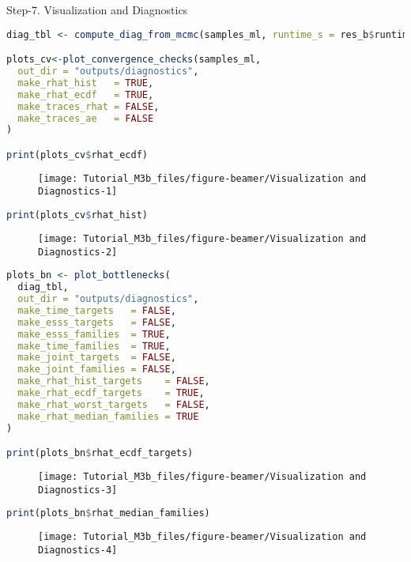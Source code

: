 \documentclass[
  10pt,
  ignorenonframetext,
  aspectratio=169]{beamer}
\begin{document}
\begin{frame}[fragile]{Step-7. Visualization and Diagnostics}
\label{step-7.-visualization-and-diagnostics}
\begin{lstlisting}[language=R]
diag_tbl <- compute_diag_from_mcmc(samples_ml, runtime_s = res_b$runtime_s)

plots_cv<-plot_convergence_checks(samples_ml,
  out_dir = "outputs/diagnostics",
  make_rhat_hist   = TRUE,
  make_rhat_ecdf   = TRUE,
  make_traces_rhat = FALSE,
  make_traces_ae   = FALSE
)

print(plots_cv$rhat_ecdf)
\end{lstlisting}

\begin{figure}
\texttt{[image: Tutorial\_M3b\_files/figure-beamer/Visualization and Diagnostics-1]} \end{figure}

\begin{lstlisting}[language=R]
print(plots_cv$rhat_hist)
\end{lstlisting}

\begin{figure}
\texttt{[image: Tutorial\_M3b\_files/figure-beamer/Visualization and Diagnostics-2]} \end{figure}

\begin{lstlisting}[language=R]
plots_bn <- plot_bottlenecks(
  diag_tbl,
  out_dir = "outputs/diagnostics",
  make_time_targets   = FALSE,
  make_esss_targets   = FALSE,
  make_esss_families  = TRUE,
  make_time_families  = TRUE,
  make_joint_targets  = FALSE,
  make_joint_families = FALSE,
  make_rhat_hist_targets    = FALSE,
  make_rhat_ecdf_targets    = TRUE,
  make_rhat_worst_targets   = FALSE,
  make_rhat_median_families = TRUE
)

print(plots_bn$rhat_ecdf_targets)
\end{lstlisting}

\begin{figure}
\texttt{[image: Tutorial\_M3b\_files/figure-beamer/Visualization and Diagnostics-3]} \end{figure}

\begin{lstlisting}[language=R]
print(plots_bn$rhat_median_families)
\end{lstlisting}

\begin{figure}
\texttt{[image: Tutorial\_M3b\_files/figure-beamer/Visualization and Diagnostics-4]} \end{figure}


\end{frame}
\end{document}
